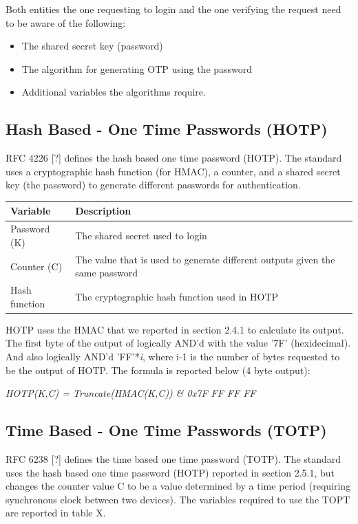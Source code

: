 \documentclass[bsc,frontabs,twoside,singlespacing,parskip,deptreport]{infthesis}     %
\begin{document}
Both entities the one requesting to login and the one verifying the request need to be aware of the following:
\begin{itemize}
\item The shared secret key (password)
\item The algorithm for generating OTP using the password
\item Additional variables the algorithms require.
\end{itemize}

\subsection{Hash Based - One Time Passwords (HOTP)}
RFC 4226 [?] defines the hash based one time password (HOTP). The standard uses a cryptographic hash function (for HMAC), a counter, and a shared secret key (the password) to generate different passwords for authentication.

\begin{table}[H]
\begin{tabular}{|l|p{10cm}|}
\hline
Variable & Description\\
\hline
Password (K) & The shared secret used to login\\
\hline
Counter (C) & The value that is used to generate different outputs given the same password\\
\hline
Hash function & The cryptographic hash function used in HOTP\\
\hline
\end{tabular}
\end{table}

HOTP uses the HMAC that we reported in section 2.4.1 to calculate its output. The first byte of the output of logically AND'd with the value '7F' (hexidecimal). And also logically AND'd 'FF'*\textit{i}, where i-1 is the number of bytes requested to be the output of HOTP. The formula is reported below (4 byte output):
\begin{center}
\textit{HOTP(K,C) = Truncate(HMAC(K,C)) \& 0x7F FF FF FF}
\end{center}

\subsection{Time Based - One Time Passwords (TOTP)}
RFC 6238 [?] defines the time based one time password (TOTP). The standard uses the hash based one time password (HOTP) reported in section 2.5.1, but changes the counter value C to be a value determined by a time period (requiring synchronous clock between two devices). The variables required to use the TOPT are reported in table X.
\end{document}

